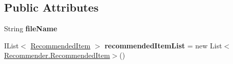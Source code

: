 \subsection*{Public Attributes}
\begin{DoxyCompactItemize}
\item 
\hypertarget{classcom_1_1shephertz_1_1app42_1_1paas_1_1sdk_1_1csharp_1_1recommend_1_1_recommender_a18142d198e331785f1492cf9de9bc505}{String {\bfseries file\+Name}}\label{classcom_1_1shephertz_1_1app42_1_1paas_1_1sdk_1_1csharp_1_1recommend_1_1_recommender_a18142d198e331785f1492cf9de9bc505}

\item 
\hypertarget{classcom_1_1shephertz_1_1app42_1_1paas_1_1sdk_1_1csharp_1_1recommend_1_1_recommender_aeb7f4d8b9e2a0d22f6c76f4478455d4a}{I\+List$<$ \hyperlink{classcom_1_1shephertz_1_1app42_1_1paas_1_1sdk_1_1csharp_1_1recommend_1_1_recommender_1_1_recommended_item}{Recommended\+Item} $>$ {\bfseries recommended\+Item\+List} = new List$<$\hyperlink{classcom_1_1shephertz_1_1app42_1_1paas_1_1sdk_1_1csharp_1_1recommend_1_1_recommender_1_1_recommended_item}{Recommender.\+Recommended\+Item}$>$()}\label{classcom_1_1shephertz_1_1app42_1_1paas_1_1sdk_1_1csharp_1_1recommend_1_1_recommender_aeb7f4d8b9e2a0d22f6c76f4478455d4a}

\end{DoxyCompactItemize}
